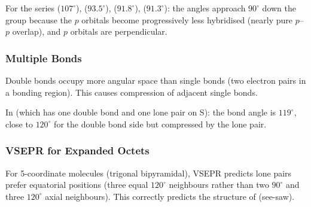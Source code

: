 \documentclass[12pt, a4paper]{book}
\begin{document}
For the series  ($107^\circ$),  ($93.5^\circ$),
 ($91.8^\circ$),  ($91.3^\circ$):
the angles approach $90^\circ$ down the group because the
$p$ orbitals become progressively less hybridised
(nearly pure $p$--$p$ overlap), and $p$ orbitals are
perpendicular.

\subsubsection{Multiple Bonds}

Double bonds occupy more angular space than single bonds
(two electron pairs in a bonding region).
This causes compression of adjacent single bonds.

In  (which has one double bond and one lone pair
on S): the bond angle is $119^\circ$, close to $120^\circ$
for the double bond side but compressed by the lone pair.

\subsubsection{VSEPR for Expanded Octets}

For 5-coordinate molecules (trigonal bipyramidal), VSEPR
predicts lone pairs prefer equatorial positions
(three equal $120^\circ$ neighbours rather than two
$90^\circ$ and three $120^\circ$ axial neighbours).
This correctly predicts the structure of  (see-saw).
\end{document}
